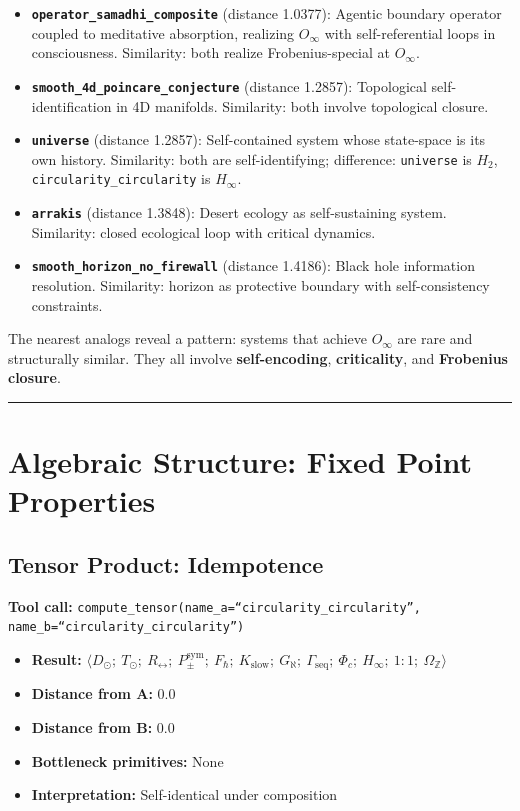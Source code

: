 \documentclass[12pt,a4paper]{article}
\begin{document}
\begin{itemize}
    \item \textbf{\texttt{operator\_samadhi\_composite}} (distance 1.0377): Agentic boundary operator coupled to meditative absorption, realizing $O_{\infty}$ with self-referential loops in consciousness. Similarity: both realize Frobenius-special at $O_{\infty}$.
    \item \textbf{\texttt{smooth\_4d\_poincare\_conjecture}} (distance 1.2857): Topological self-identification in 4D manifolds. Similarity: both involve topological closure.
    \item \textbf{\texttt{universe}} (distance 1.2857): Self-contained system whose state-space is its own history. Similarity: both are self-identifying; difference: \texttt{universe} is $H_2$, \texttt{circularity\_circularity} is $H_{\infty}$.
    \item \textbf{\texttt{arrakis}} (distance 1.3848): Desert ecology as self-sustaining system. Similarity: closed ecological loop with critical dynamics.
    \item \textbf{\texttt{smooth\_horizon\_no\_firewall}} (distance 1.4186): Black hole information resolution. Similarity: horizon as protective boundary with self-consistency constraints.
\end{itemize}

The nearest analogs reveal a pattern: systems that achieve $O_{\infty}$ are rare and structurally similar. They all involve \textbf{self-encoding}, \textbf{criticality}, and \textbf{Frobenius closure}.

\begin{center}
\rule{0.5\textwidth}{0.4pt}
\end{center}

\section{Algebraic Structure: Fixed Point Properties}

\subsection{Tensor Product: Idempotence}

\textbf{Tool call:} \texttt{compute\_tensor(name\_a=\textquotedblleft circularity\_circularity\textquotedblright, name\_b=\textquotedblleft circularity\_circularity\textquotedblright)}

\begin{itemize}
    \item \textbf{Result:} $\langle D_{\odot};\ T_{\odot};\ R_{\leftrightarrow};\ P_{\pm}^{\text{sym}};\ F_{\hbar};\ K_\text{slow};\ G_{\aleph};\ \Gamma_\text{seq};\ \Phi_c;\ H_{\infty};\ 1{:}1;\ \Omega_\mathbb{Z} \rangle$
    \item \textbf{Distance from A:} 0.0
    \item \textbf{Distance from B:} 0.0
    \item \textbf{Bottleneck primitives:} None
    \item \textbf{Interpretation:} Self-identical under composition
\end{itemize}
\end{document}
